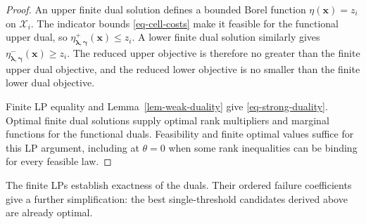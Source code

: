 \documentclass[review,11pt,3p,authoryear,nopreprintline]{elsarticle}
\begin{document}
\begin{proof}
  An upper finite dual solution defines a bounded Borel function $\eta(\bm x)=z_i$ on $\mathcal X_i$. The indicator bounds \eqref{eq-cell-costs} make it feasible for the functional upper dual, so $\eta^+_{\bm\lambda,\bm\gamma}(\bm x)\le z_i$. A lower finite dual solution similarly gives $\eta^-_{\bm\lambda,\bm\gamma}(\bm x)\ge z_i$. The reduced upper objective is therefore no greater than the finite upper dual objective, and the reduced lower objective is no smaller than the finite lower dual objective.

  Finite LP equality and Lemma~\ref{lem-weak-duality} give \eqref{eq-strong-duality}. Optimal finite dual solutions supply optimal rank multipliers and marginal functions for the functional duals. Feasibility and finite optimal values suffice for this LP argument, including at $\theta=0$ when some rank inequalities can be binding for every feasible law.
\end{proof}

The finite LPs establish exactness of the duals. Their ordered failure coefficients give a further simplification: the best single-threshold candidates derived above are already optimal.
\end{document}
